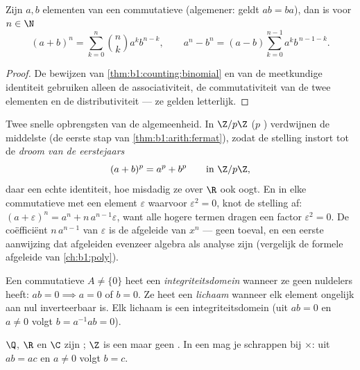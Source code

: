 \begin{proposition}\label{prop:b1:structures:binomial}
Zijn $a, b$ elementen van een commutatieve  (algemener: geldt $ab =
ba$), dan is voor $n \in \N$
\[
(a+b)^n = \sum_{k=0}^n \binom nk a^k b^{n-k},
\qquad
a^n - b^n = (a - b) \sum_{k=0}^{n-1} a^k b^{\,n-1-k} .
\]
\end{proposition}

\begin{proof}
De bewijzen van \cref{thm:b1:counting:binomial} en van de meetkundige
identiteit gebruiken alleen de associativiteit, de commutativiteit van de
twee elementen en de distributiviteit --- ze gelden letterlijk.
\end{proof}

\begin{example}\label{ex:b1:structures:binomialring}
Twee snelle opbrengsten van de algemeenheid. In $\Z/p\Z$ ($p$ )
verdwijnen de middelste  (de eerste stap van
\cref{thm:b1:arith:fermat}), zodat de stelling instort tot de
\emph{droom van de eerstejaars}
\[
(a + b)^p = a^p + b^p \qquad \text{in } \Z/p\Z ,
\]
daar een echte identiteit, hoe misdadig ze over $\R$ ook oogt. En in elke
commutatieve  met een element $\varepsilon$ waarvoor $\varepsilon^2 =
0$, knot de stelling af: $(a + \varepsilon)^n = a^n +
n\,a^{n-1}\varepsilon$, want alle hogere termen dragen een factor
$\varepsilon^2 = 0$. De coëfficiënt $n\,a^{n-1}$ van $\varepsilon$ is de
afgeleide van $x^n$ --- geen toeval, en een eerste aanwijzing dat
afgeleiden evenzeer algebra als analyse zijn (vergelijk de formele
afgeleide van \cref{ch:b1:poly}).
\end{example}

\begin{definition}\label{def:b1:structures:field}
Een commutatieve  $A \neq \{0\}$ heet een
\emph{integriteitsdomein} wanneer ze geen
nuldelers heeft: $ab = 0 \implies a = 0$ of $b = 0$. Ze heet een
\emph{lichaam} wanneer elk element ongelijk aan nul
inverteerbaar is. Elk lichaam is een integriteitsdomein (uit $ab = 0$ en
$a \neq 0$ volgt $b = a^{-1}ab = 0$).
\end{definition}

\begin{example}
$\Q$, $\R$ en $\C$ zijn ; $\Z$ is een  maar
geen . In een  mag je schrappen bij $\times$: uit
$ab = ac$ en $a \neq 0$ volgt $b = c$.
\end{example}

